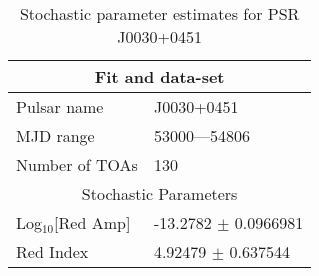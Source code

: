 \documentclass{article}
\begin{document}
\begin{table*}
\caption{Stochastic parameter estimates for PSR J0030+0451}
\begin{tabular}{ll}
\hline\hline
\multicolumn{2}{c}{Fit and data-set} \\ 
\hline
Pulsar name\dotfill & J0030+0451 \\ 
MJD range\dotfill & 53000---54806 \\ 
Number of TOAs\dotfill & 130 \\
\hline
\multicolumn{2}{c}{Stochastic Parameters} \\ 
\hline
Log$_{10}$[Red Amp] \dotfill & -13.2782 $\pm$ 0.0966981  \\ 
Red Index \dotfill & 4.92479 $\pm$ 0.637544  \\ 
\hline
\end{tabular}
\label{Table:J0030+0451}
\end{table*} 
\end{document}
